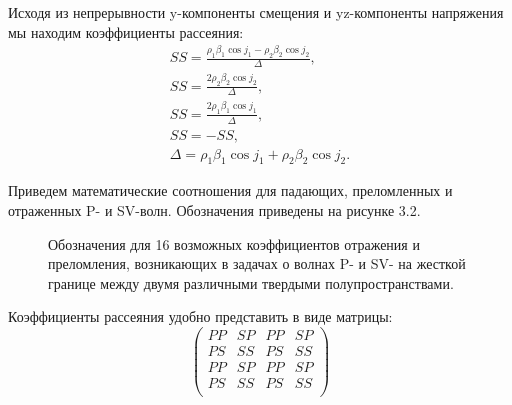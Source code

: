 Исходя из непрерывности y-компоненты смещения и yz-компоненты напряжения мы находим коэффициенты рассеяния:
\begin{eqnarray}
SS = \frac{\rho_1 \beta_1 \cos{j_1} - \rho_2 \beta_2 \cos{j_2}}{\Delta}, \\
SS = \frac{2 \rho_2 \beta_2 \cos{j_2}}{\Delta}, \\
SS = \frac{2 \rho_1 \beta_1 \cos{j_1}}{\Delta}, \\
SS = - SS, \\
\Delta = \rho_1 \beta_1 \cos{j_1} + \rho_2 \beta_2 \cos{j_2}.
\end{eqnarray}

Приведем математические соотношения для падающих, преломленных и отраженных P- и SV-волн. Обозначения приведены на рисунке 3.2.

\begin{figure}[h]
\caption{Обозначения для 16 возможных коэффициентов отражения и преломления, возникающих в задачах о волнах P- и SV- на жесткой границе между двумя различными твердыми полупространствами.}
\end{figure}

Коэффициенты рассеяния удобно представить в виде матрицы:
\begin{displaymath}
\left( \begin{array}{cccc}
PP & SP & PP & SP \\
PS & SS & PS & SS \\
PP & SP & PP & SP \\
PS & SS & PS & SS \\
\end{array} \right)
\end{displaymath} 

